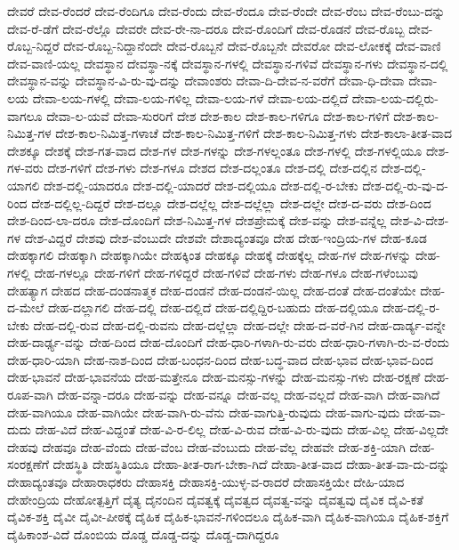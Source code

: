 {ದೇವರೆ
ದೇವ-ರೆಂದರೆ
ದೇವ-ರೆಂದಿಗೂ
ದೇವ-ರೆಂದು
ದೇವ-ರೆಂದೂ
ದೇವ-ರೆಂದೇ
ದೇವ-ರೆಂಬ
ದೇವ-ರೆಂಬು-ದನ್ನು
ದೇವ-ರೆ-ಡೆಗೆ
ದೇವ-ರೆಲ್ಲೊ
ದೇವರೇ
ದೇವ-ರೇ-ನಾ-ದರೂ
ದೇವ-ರೊಂದಿಗೆ
ದೇವ-ರೊಡನೆ
ದೇವ-ರೊಬ್ಬ
ದೇವ-ರೊಬ್ಬ-ನಿದ್ದರೆ
ದೇವ-ರೊಬ್ಬ-ನಿದ್ದಾನೆಂದೇ
ದೇವ-ರೊಬ್ಬನೆ
ದೇವ-ರೊಬ್ಬನೇ
ದೇವರೋ
ದೇವ-ಲೋಕಕ್ಕೆ
ದೇವ-ವಾಣಿ
ದೇವ-ವಾಣಿ-ಯಲ್ಲ
ದೇವಸ್ಥಾನ
ದೇವಸ್ಥಾ-ನಕ್ಕೆ
ದೇವಸ್ಥಾನ-ಗಳಲ್ಲಿ
ದೇವಸ್ಥಾನ-ಗಳಿವೆ
ದೇವಸ್ಥಾನ-ಗಳು
ದೇವಸ್ಥಾನ-ದಲ್ಲಿ
ದೇವಸ್ಥಾನ-ವನ್ನು
ದೇವಸ್ಥಾನ-ವಿ-ರು-ವು-ದನ್ನು
ದೇವಾಂಶರು
ದೇವಾ-ದಿ-ದೇವ-ನ-ವರೆಗೆ
ದೇವಾ-ಧಿ-ದೇವಾ
ದೇವಾ-ಲಯ
ದೇವಾ-ಲಯ-ಗಳಲ್ಲಿ
ದೇವಾ-ಲಯ-ಗಳಿಲ್ಲ
ದೇವಾ-ಲಯ-ಗಳೆ
ದೇವಾ-ಲಯ-ದಲ್ಲಿದೆ
ದೇವಾ-ಲಯ-ದಲ್ಲಿರು-ವಾಗಲೂ
ದೇವಾ-ಲ-ಯವೆ
ದೇವಾ-ಸುರರಿಗೆ
ದೇಶ
ದೇಶ-ಕಾಲ
ದೇಶ-ಕಾಲ-ಗಳಿಗೂ
ದೇಶ-ಕಾಲ-ಗಳಿಗೆ
ದೇಶ-ಕಾಲ-ನಿಮಿತ್ತ-ಗಳ
ದೇಶ-ಕಾಲ-ನಿಮಿತ್ತ-ಗಳಾಚೆ
ದೇಶ-ಕಾಲ-ನಿಮಿತ್ತ-ಗಳಿಗೆ
ದೇಶ-ಕಾಲ-ನಿಮಿತ್ತ-ಗಳು
ದೇಶ-ಕಾಲಾ-ತೀತ-ವಾದ
ದೇಶಕ್ಕೂ
ದೇಶಕ್ಕೆ
ದೇಶ-ಗತ-ವಾದ
ದೇಶ-ಗಳ
ದೇಶ-ಗಳನ್ನು
ದೇಶ-ಗಳಲ್ಲಂತೂ
ದೇಶ-ಗಳಲ್ಲಿ
ದೇಶ-ಗಳಲ್ಲಿಯೂ
ದೇಶ-ಗಳ-ವರು
ದೇಶ-ಗಳಿಗೆ
ದೇಶ-ಗಳು
ದೇಶ-ಗಳೂ
ದೇಶದ
ದೇಶ-ದಲ್ಲಂತೂ
ದೇಶ-ದಲ್ಲಿ
ದೇಶ-ದಲ್ಲಿನ
ದೇಶ-ದಲ್ಲಿ-ಯಾಗಲಿ
ದೇಶ-ದಲ್ಲಿ-ಯಾದರೂ
ದೇಶ-ದಲ್ಲಿ-ಯಾದರೆ
ದೇಶ-ದಲ್ಲಿಯೂ
ದೇಶ-ದಲ್ಲಿ-ರ-ಬೇಕು
ದೇಶ-ದಲ್ಲಿ-ರು-ವು-ದ-ರಿಂದ
ದೇಶ-ದಲ್ಲಿಲ್ಲ-ದಿದ್ದರೆ
ದೇಶ-ದಲ್ಲೂ
ದೇಶ-ದಲ್ಲೆಲ್ಲ
ದೇಶ-ದಲ್ಲೆಲ್ಲಾ
ದೇಶ-ದಲ್ಲೇ
ದೇಶ-ದ-ವರು
ದೇಶ-ದಿಂದ
ದೇಶ-ದಿಂದ-ಲಾ-ದರೂ
ದೇಶ-ದೊಂದಿಗೆ
ದೇಶ-ನಿಮಿತ್ತ-ಗಳ
ದೇಶಪ್ರೇಮಕ್ಕೆ
ದೇಶ-ವನ್ನು
ದೇಶ-ವನ್ನೆಲ್ಲ
ದೇಶ-ವಿ-ದೇಶ-ಗಳ
ದೇಶ-ವಿದ್ದರೆ
ದೇಶವು
ದೇಶ-ವೆಂಬುದೇ
ದೇಶವೇ
ದೇಶಾದ್ಯಂತವೂ
ದೇಹ
ದೇಹ-ಇಂದ್ರಿಯ-ಗಳ
ದೇಹ-ಕೂಡ
ದೇಹಕ್ಕಾಗಲಿ
ದೇಹಕ್ಕಾಗಿ
ದೇಹಕ್ಕಾಗಿಯೇ
ದೇಹಕ್ಕಿಂತ
ದೇಹಕ್ಕೂ
ದೇಹಕ್ಕೆ
ದೇಹಕ್ಕೆಲ್ಲ
ದೇಹ-ಗಳ
ದೇಹ-ಗಳನ್ನು
ದೇಹ-ಗಳಲ್ಲಿ
ದೇಹ-ಗಳಲ್ಲೂ
ದೇಹ-ಗಳಿಗೆ
ದೇಹ-ಗಳಿದ್ದರೆ
ದೇಹ-ಗಳಿವೆ
ದೇಹ-ಗಳು
ದೇಹ-ಗಳೂ
ದೇಹ-ಗಳೆಂಬುವು
ದೇಹತ್ಯಾಗ
ದೇಹದ
ದೇಹ-ದಂಡನಾತ್ಮಕ
ದೇಹ-ದಂಡನೆ
ದೇಹ-ದಂಡನೆ-ಯಿಲ್ಲ
ದೇಹ-ದಂತೆ
ದೇಹ-ದಂತೆಯೇ
ದೇಹ-ದ-ಮೇಲೆ
ದೇಹ-ದಲ್ಲಾಗಲಿ
ದೇಹ-ದಲ್ಲಿ
ದೇಹ-ದಲ್ಲಿದೆ
ದೇಹ-ದಲ್ಲಿದ್ದಿರ-ಬಹುದು
ದೇಹ-ದಲ್ಲಿಯೂ
ದೇಹ-ದಲ್ಲಿ-ರ-ಬೇಕು
ದೇಹ-ದಲ್ಲಿ-ರುವ
ದೇಹ-ದಲ್ಲಿ-ರುವನು
ದೇಹ-ದಲ್ಲೆಲ್ಲಾ
ದೇಹ-ದಲ್ಲೇ
ದೇಹ-ದ-ವರೆ-ಗಿನ
ದೇಹ-ದಾರ್ಡ್ಯ-ವನ್ನೇ
ದೇಹ-ದಾರ್ಢ್ಯ-ವನ್ನು
ದೇಹ-ದಿಂದ
ದೇಹ-ದೊಂದಿಗೆ
ದೇಹ-ಧಾರಿ-ಗಳಾಗಿ-ರು-ವರು
ದೇಹ-ಧಾರಿ-ಗಳಾಗಿ-ರು-ವ-ರೆಂದು
ದೇಹ-ಧಾರಿ-ಯಾಗಿ
ದೇಹ-ನಾಶ-ದಿಂದ
ದೇಹ-ಬಂಧನ-ದಿಂದ
ದೇಹ-ಬದ್ಧ-ವಾದ
ದೇಹ-ಭಾವ
ದೇಹ-ಭಾವ-ದಿಂದ
ದೇಹ-ಭಾವನೆ
ದೇಹ-ಭಾವನೆಯ
ದೇಹ-ಮತ್ತೇನೂ
ದೇಹ-ಮನಸ್ಸು-ಗಳನ್ನು
ದೇಹ-ಮನಸ್ಸು-ಗಳು
ದೇಹ-ರಕ್ಷಣೆ
ದೇಹ-ರೂಪ-ವಾಗಿ
ದೇಹ-ವನ್ನಾ-ದರೂ
ದೇಹ-ವನ್ನು
ದೇಹ-ವನ್ನೂ
ದೇಹ-ವಲ್ಲ
ದೇಹ-ವಲ್ಲದೆ
ದೇಹ-ವಾಗಿ
ದೇಹ-ವಾಗಿದೆ
ದೇಹ-ವಾಗಿಯೂ
ದೇಹ-ವಾಗಿಯೇ
ದೇಹ-ವಾಗಿ-ರು-ವೆನು
ದೇಹ-ವಾಗುತ್ತಿ-ರುವುದು
ದೇಹ-ವಾಗು-ವುದು
ದೇಹ-ವಾ-ದುದು
ದೇಹ-ವಿದೆ
ದೇಹ-ವಿದ್ದಂತೆ
ದೇಹ-ವಿ-ರ-ಲಿಲ್ಲ
ದೇಹ-ವಿ-ರುವ
ದೇಹ-ವಿ-ರು-ವುದು
ದೇಹ-ವಿಲ್ಲ
ದೇಹ-ವಿಲ್ಲದೇ
ದೇಹವು
ದೇಹವೂ
ದೇಹ-ವೆಂದು
ದೇಹ-ವೆಂಬ
ದೇಹ-ವೆಂಬುದು
ದೇಹ-ವೆಲ್ಲ
ದೇಹವೇ
ದೇಹ-ಶಕ್ತಿ-ಯಾಗಿ
ದೇಹ-ಸಂರಕ್ಷಣೆಗೆ
ದೇಹಸ್ಥಿತಿ
ದೇಹಸ್ಥಿತಿಯೂ
ದೇಹಾ-ತೀತ-ರಾಗ-ಬೇಕಾ-ಗಿದೆ
ದೇಹಾ-ತೀತ-ವಾದ
ದೇಹಾ-ತೀತ-ವಾ-ದು-ದನ್ನು
ದೇಹಾದ್ಯಂತವೂ
ದೇಹಾರಾಧಕರು
ದೇಹಾಸಕ್ತಿ
ದೇಹಾಸಕ್ತಿ-ಯುಳ್ಳ-ವ-ರಾದರೆ
ದೇಹಾಸಕ್ತಿಯೇ
ದೇಹಿ-ಯಾದ
ದೇಹೇಂದ್ರಿಯ
ದೇಹೋತ್ಪತ್ತಿಗೆ
ದೈತ್ಯ
ದೈನಂದಿನ
ದೈವತ್ವಕ್ಕೆ
ದೈವತ್ವದ
ದೈವತ್ವ-ವನ್ನು
ದೈವತ್ವವು
ದೈವಿಕ
ದೈವಿ-ಕತೆ
ದೈವಿಕ-ಶಕ್ತಿ
ದೈವೀ
ದೈವೀ-ಪೀಠಕ್ಕೆ
ದೈಹಿಕ
ದೈಹಿಕ-ಭಾವನೆ-ಗಳಿಂದಲೂ
ದೈಹಿಕ-ವಾಗಿ
ದೈಹಿಕ-ವಾಗಿಯೂ
ದೈಹಿಕ-ಶಕ್ತಿಗೆ
ದೈಹಿಕಾಂಶ-ವಿದೆ
ದೊಂಬಿಯ
ದೊಡ್ಡ
ದೊಡ್ಡ-ದನ್ನು
ದೊಡ್ಡ-ದಾಗಿದ್ದರೂ
}

